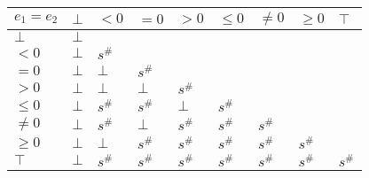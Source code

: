 \documentclass{article}
\begin{document}
\begin{table}[]
    \begin{tabular}{|l|l|l|l|l|l|l|l|l|}
    \hline
    $e_1 = e_2$ & $\bot$ & $<0$   & $=0$   & $>0$   & $\le 0$ & $\ne 0$ & $\ge 0$ & $\top$ \\ \hline
    $\bot$      & $\bot$ &        &        &        &         &         &         &        \\ \hline
    $<0$        & $\bot$ & $s^\#$ &        &        &         &         &         &        \\ \hline
    $=0$        & $\bot$ & $\bot$ & $s^\#$ &        &         &         &         &        \\ \hline
    $>0$        & $\bot$ & $\bot$ & $\bot$ & $s^\#$ &         &         &         &        \\ \hline
    $\le 0$     & $\bot$ & $s^\#$ & $s^\#$ & $\bot$ & $s^\#$  &         &         &        \\ \hline
    $\ne 0$     & $\bot$ & $s^\#$ & $\bot$ & $s^\#$ & $s^\#$  & $s^\#$  &         &        \\ \hline
    $\ge 0$     & $\bot$ & $\bot$ & $s^\#$ & $s^\#$ & $s^\#$  & $s^\#$  & $s^\#$  &        \\ \hline
    $\top$      & $\bot$ & $s^\#$ & $s^\#$ & $s^\#$ & $s^\#$  & $s^\#$  & $s^\#$  & $s^\#$ \\ \hline
    \end{tabular}
    \end{table}
\end{document}
